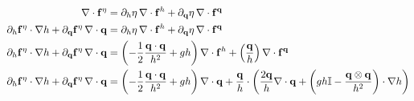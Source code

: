 \begin{align}
  \nabla\cdot\mathbf{f}^\eta
  &= 
    \partial_h\eta\,\nabla\cdot
    \mathbf{f}^h
  + \partial_{\mathbf{q}}\eta\,\nabla\cdot
    \mathbf{f}^{\mathbf{q}}
  \\
  \partial_h\mathbf{f}^\eta\cdot\nabla h
  + \partial_{\mathbf{q}}\mathbf{f}^\eta
  \,\nabla\cdot\mathbf{q}
  &= 
    \partial_h\eta\,\nabla\cdot
    \mathbf{f}^h
  + \partial_{\mathbf{q}}\eta\,\nabla\cdot
    \mathbf{f}^{\mathbf{q}}
  \\
  \partial_h\mathbf{f}^\eta\cdot\nabla h
  + \partial_{\mathbf{q}}\mathbf{f}^\eta
  \,\nabla\cdot\mathbf{q}
  &= 
    \left(-\frac{1}{2}\frac{\mathbf{q}\cdot\mathbf{q}}{h^2}
    + gh\right)
    \nabla\cdot\mathbf{f}^h
    + \left(\frac{\mathbf{q}}{h}\right)
    \nabla\cdot\mathbf{f}^{\mathbf{q}}
  \\
  \partial_h\mathbf{f}^\eta\cdot\nabla h
  + \partial_{\mathbf{q}}\mathbf{f}^\eta
  \,\nabla\cdot\mathbf{q}
  &= 
    \left(-\frac{1}{2}\frac{\mathbf{q}\cdot\mathbf{q}}{h^2}
    + gh\right)
    \nabla\cdot\mathbf{q}
    + \frac{\mathbf{q}}{h}\cdot
    \left(\frac{2\mathbf{q}}{h}\nabla\cdot\mathbf{q}
    + \left(gh\mathbb{I}
    - \frac{\mathbf{q}\otimes\mathbf{q}}{h^2}\right)\cdot\nabla h\right)
\end{align}


